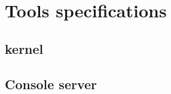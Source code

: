 \chapter{Tools specifications}
\label{sec:tools}

\section{\urbi kernel}
\section{Console server}
\section{\umake}

